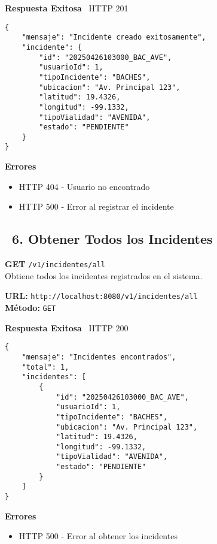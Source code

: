 \begin{tcolorbox}[response]
    \textbf{Respuesta Exitosa} \faCheckCircle\ \textcolor{successColor}{HTTP 201}
    \begin{verbatim}
{
    "mensaje": "Incidente creado exitosamente",
    "incidente": {
        "id": "20250426103000_BAC_AVE",
        "usuarioId": 1,
        "tipoIncidente": "BACHES",
        "ubicacion": "Av. Principal 123",
        "latitud": 19.4326,
        "longitud": -99.1332,
        "tipoVialidad": "AVENIDA",
        "estado": "PENDIENTE"
    }
}
    \end{verbatim}
    \textbf{Errores}
    \begin{itemize}
        \item \textcolor{errorColor}{HTTP 404} - Usuario no encontrado
        \item \textcolor{errorColor}{HTTP 500} - Error al registrar el incidente
    \end{itemize}
\end{tcolorbox}

\newpage

\subsection*{\faServer\ 6. Obtener Todos los Incidentes}
\begin{tcolorbox}[endpoint]
    \textbf{GET} \texttt{/v1/incidentes/all}\\
    Obtiene todos los incidentes registrados en el sistema.
\end{tcolorbox}

\begin{tcolorbox}[request]
    \textbf{URL:} \textcolor{urlColor}{\texttt{http://localhost:8080/v1/incidentes/all}}\\
    \textbf{Método:} \textcolor{methodColor}{\texttt{GET}}
\end{tcolorbox}

\begin{tcolorbox}[response]
    \textbf{Respuesta Exitosa} \faCheckCircle\ \textcolor{successColor}{HTTP 200}
    \begin{verbatim}
{
    "mensaje": "Incidentes encontrados",
    "total": 1,
    "incidentes": [
        {
            "id": "20250426103000_BAC_AVE",
            "usuarioId": 1,
            "tipoIncidente": "BACHES",
            "ubicacion": "Av. Principal 123",
            "latitud": 19.4326,
            "longitud": -99.1332,
            "tipoVialidad": "AVENIDA",
            "estado": "PENDIENTE"
        }
    ]
}
    \end{verbatim}
    \textbf{Errores}
    \begin{itemize}
        \item \textcolor{errorColor}{HTTP 500} - Error al obtener los incidentes
    \end{itemize}
\end{tcolorbox}


